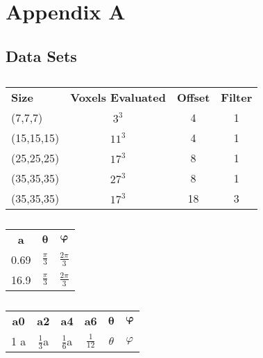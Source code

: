 
\chapter{Appendix A}\label{app:appendixA}


\section{Data Sets}

\begin{table}[h]
    \centering
    \caption{}
    \label{tab:periodic_data_sets_sizes}
    \begin{tabular}{ l c c c }
        \hline
        \textbf{Size} & \textbf{Voxels Evaluated} & \textbf{Offset} & \textbf{Filter} \\
        (7,7,7)       & $3^{3}$                   & 4               & 1               \\
        (15,15,15)    & $11^{3}$                  & 4               & 1               \\
        (25,25,25)    & $17^{3}$                  & 8               & 1               \\
        (35,35,35)    & $27^{3}$                  & 8               & 1               \\
        (35,35,35)    & $17^{3}$                  & 18              & 3               \\
        \hline
    \end{tabular}
\end{table}


\begin{table}[h]
    \centering
    \caption{}
    \label{tab:periodic_data_sets_coefficients}
    \begin{tabular}{ c c c }
        \hline
        \textbf{a} & $\bm{\theta}$   & $\bm{\varphi}$   \\
        0.69       & $\frac{\pi}{3}$ & $\frac{2\pi}{3}$ \\
        16.9       & $\frac{\pi}{3}$ & $\frac{2\pi}{3}$ \\
        \hline
    \end{tabular}

    \begin{tabular}{ c c c c c c}
        \textbf{a0} & \textbf{a2}    & \textbf{a4}    & \textbf{a6}    & $\bm{\theta}$ & $\bm{\varphi}$ \\
        1 a         & $\frac{1}{3}$a & $\frac{1}{6}$a & $\frac{1}{12}$ & $\theta$      & $\varphi$      \\
        \hline
    \end{tabular}
\end{table}


